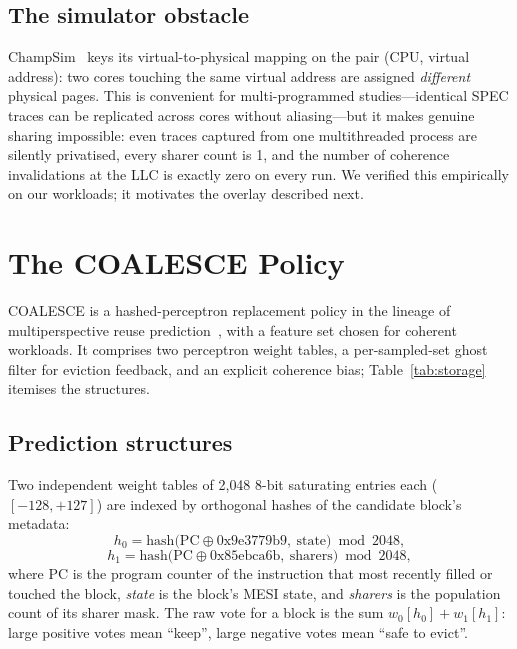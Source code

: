 \documentclass[conference]{IEEEtran}
\begin{document}
\subsection{The simulator obstacle}
\label{sec:obstacle}

ChampSim~\cite{champsim2022} keys its virtual-to-physical mapping on the pair (CPU, virtual address): two cores touching the same virtual address are assigned \emph{different} physical pages. This is convenient for multi-programmed studies---identical SPEC traces can be replicated across cores without aliasing---but it makes genuine sharing impossible: even traces captured from one multithreaded process are silently privatised, every sharer count is 1, and the number of coherence invalidations at the LLC is exactly zero on every run. We verified this empirically on our workloads; it motivates the overlay described next.

\section{The COALESCE Policy}
\label{sec:design}

COALESCE is a hashed-perceptron replacement policy in the lineage of multiperspective reuse prediction~\cite{jimenez2017multiperspective}, with a feature set chosen for coherent workloads. It comprises two perceptron weight tables, a per-sampled-set ghost filter for eviction feedback, and an explicit coherence bias; Table~\ref{tab:storage} itemises the structures.

\subsection{Prediction structures}

Two independent weight tables of 2{,}048 8-bit saturating entries each ($[-128, +127]$) are indexed by orthogonal hashes of the candidate block's metadata:
\begin{equation}
h_0 = \mathrm{hash}\big(\mathrm{PC} \oplus \mathrm{0x9e3779b9},\ \mathrm{state}\big) \bmod 2048,
\end{equation}
\begin{equation}
h_1 = \mathrm{hash}\big(\mathrm{PC} \oplus \mathrm{0x85ebca6b},\ \mathrm{sharers}\big) \bmod 2048,
\end{equation}
where PC is the program counter of the instruction that most recently filled or touched the block, \emph{state} is the block's MESI state, and \emph{sharers} is the population count of its sharer mask. The raw vote for a block is the sum $w_0[h_0] + w_1[h_1]$: large positive votes mean ``keep'', large negative votes mean ``safe to evict''.
\end{document}
